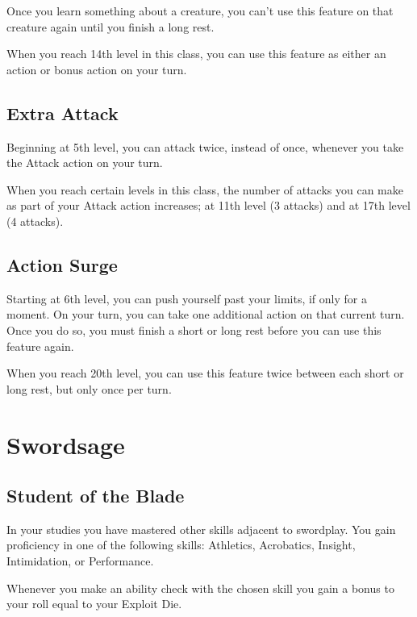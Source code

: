 \documentclass[letterpaper,justified,openany,oneside,twocolumn]{dndbook}
\begin{document}
Once you learn something about a creature, you can't use this feature on that creature again until you finish a long rest.

When you reach 14th level in this class, you can use this feature as either an action or bonus action on your turn.

\subsection*{Extra Attack}
Beginning at 5th level, you can attack twice, instead of once, whenever you take the Attack action on your turn.

When you reach certain levels in this class, the number of attacks you can make as part of your Attack action increases; at 11th level (3 attacks) and at 17th level (4 attacks).

\subsection*{Action Surge}
Starting at 6th level, you can push yourself past your limits, if only for a moment. On your turn, you can take one additional action on that current turn. Once you do so, you must finish a short or long rest before you can use this feature again.

When you reach 20th level, you can use this feature twice between each short or long rest, but only once per turn.

\section*{Swordsage}
\subsection*{Student of the Blade}
In your studies you have mastered other skills adjacent to swordplay. You gain proficiency in one of the following skills: Athletics, Acrobatics, Insight, Intimidation, or Performance.

Whenever you make an ability check with the chosen skill you gain a bonus to your roll equal to your Exploit Die.
\end{document}
